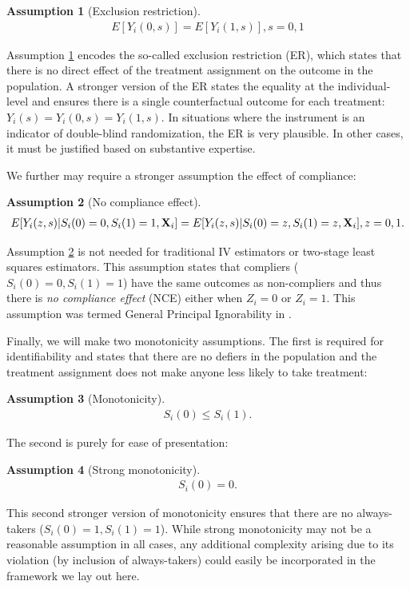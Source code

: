 \documentclass{article}
\newtheorem{assumption}{Assumption}
\begin{document}
\begin{assumption}[Exclusion restriction]\label{er}
\begin{align*}
    E[Y_i(0, s)] = E[Y_i(1, s)], s = 0, 1 \label{er}
    \end{align*}
\end{assumption} 
Assumption \ref{er} encodes the so-called exclusion restriction (ER), which states that there is no direct effect of the treatment assignment on the outcome in the population. A stronger version of the ER states the equality at the individual-level and ensures there is a single counterfactual outcome for each treatment: $Y_i(s) = Y_i(0, s) = Y_i(1,s)$. In situations where the instrument is an indicator of double-blind randomization, the ER is very plausible. In other cases, it must be justified based on substantive expertise. 

We further may require a stronger assumption the effect of compliance:
\begin{assumption}[No compliance effect]\label{nce}
\begin{align*}
    E[Y_i(z, s) | S_i(0) = 0, S_i(1) = 1, {\bf X}_i] = E[Y_i(z, s) | S_i(0) = z, S_i(1) = z, {\bf X}_i], z = 0, 1. 
    \end{align*}
\end{assumption}
Assumption \ref{nce} is not needed for traditional IV estimators or two-stage least squares estimators. This assumption states that compliers ($S_i(0) = 0, S_i(1) = 1$) have the same outcomes as non-compliers and thus there is \textit{no compliance effect} (NCE) either when $Z_i = 0$ or $Z_i = 1$. This assumption was termed General Principal Ignorability  in \cite{Ding2017}.

Finally, we will make two monotonicity assumptions. The first is required for identifiability and states that there are no defiers in the population and the treatment assignment does not make anyone less likely to take treatment:
\begin{assumption}[Monotonicity]\label{monotonicity}
\begin{align*}
S_i(0) \leq S_i(1). 
\end{align*}
\end{assumption}
The second is purely for ease of presentation:
\begin{assumption}[Strong monotonicity]\label{strong_monotonicity}
\begin{align*}
S_i(0) = 0. 
\end{align*}
\end{assumption}
This second stronger version of monotonicity ensures that there are no always-takers ($S_i(0) = 1, S_i(1) = 1$). While strong monotonicity may not be a reasonable assumption in all cases, any additional complexity arising due to its violation (by inclusion of always-takers) could easily be incorporated in the framework we lay out here. 
\end{document}
